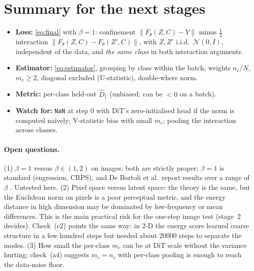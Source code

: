 \documentclass[11pt]{article}
\theoremstyle{definition}
\theoremstyle{remark}
\newcommand{\N}{\mathcal{N}}
\newcommand{\norm}[1]{\lVert #1\rVert}
\begin{document}
\section{Summary for the next stages}\label{sec:summary}
\begin{itemize}
\item \textbf{Loss:} \eqref{eq:final} with $\beta=1$: confinement $\norm{F_\theta(Z,C)-Y}$ minus $\tfrac12$
interaction $\norm{F_\theta(Z,C)-F_\theta(Z',C)}$, with $Z,Z'$ i.i.d.\ $\N(0,I)$, independent of the data,
and \emph{the same class} in both interaction arguments.
\item \textbf{Estimator:} \eqref{eq:estimator}, grouping by class within the batch, weights $n_c/N$,
$m_c\ge2$, diagonal excluded (U-statistic), double-where norm.
\item \textbf{Metric:} per-class held-out $\widehat D_1$ (unbiased; can be $<0$ on a batch).
\item \textbf{Watch for:} \texttt{NaN} at step $0$ with DiT's zero-initialised head if the norm is computed
naively; V-statistic bias with small $m_c$; pooling the interaction across classes.
\end{itemize}
\paragraph{Open questions.} (1) $\beta=1$ versus $\beta\in(1,2)$ on images: both are strictly proper;
$\beta=1$ is standard (engression, CRPS), and De Bortoli et al.\ report results over a range of $\beta$
\cite{DeBortoli2025}. Untested here. (2) Pixel space versus latent space: the theory is the same, but the
Euclidean norm on pixels is a poor perceptual metric, and the energy distance in high dimension may be
dominated by low-frequency or mean differences. This is the main practical risk for the one-step image test
(stage~2 decides). Check~(c2) points the same way: in 2-D the energy score learned coarse structure in a
few hundred steps but needed about $20000$ steps to separate the modes. (3) How small the per-class $m_c$ can be at DiT scale without the variance hurting;
check~(a4) suggests $m_c=n_c$ with per-class pooling is enough to reach the data-noise floor.
\end{document}
